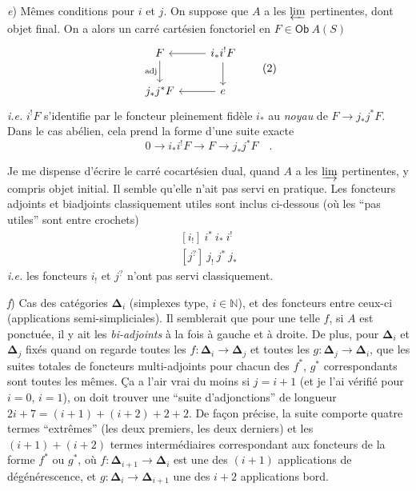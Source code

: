 \documentclass[11pt]{article}
\newcommand{\printedpage}[1]{\marginpar{\footnotesize p.~#1}}
\newcommand{\msp}[1]{\marginpar{\footnotesize [#1]}}
\newcommand{\Ob}{\mathsf{Ob}}
\newcommand{\bDelta}{\boldsymbol{\Delta}}
\begin{document}
\textit{e}) Mêmes conditions pour $i$ et $j$. On suppose que $A$ a les $\varprojlim$ pertinentes, dont objet final. On a alors un carré cartésien fonctoriel en $F\in \Ob\ A(S)$ 
\[
\begin{tikzcd}
F \arrow[d, "\text{adj}"'] & i_{*}i^{!}F \arrow[l] \arrow[d] \\
j_{*}j^{*}F & e \arrow[l]
\end{tikzcd}
\tag*{(2)}
\]
\textit{i.e.} $i^{!}F$ s'identifie par le foncteur pleinement fidèle $i_{*}$ au \textit{noyau} de $F\to j_{*}j^{*}F$. Dans le cas abélien, cela prend la forme d'une suite exacte
\[
0 \longrightarrow i_{*}i^{!}F \longrightarrow F \longrightarrow j_{*}j^{*}F \quad .
\]

\clearpage

\printedpage{3}

\msp{page 3}

Je me dispense d'écrire le carré cocartésien dual, quand $A$ a les $\varinjlim$ pertinentes, y compris objet initial. Il semble qu'elle n'ait pas servi en pratique. Les foncteurs adjoints et biadjoints classiquement utiles sont inclus ci-dessous (où les “pas utiles” sont entre crochets)
\[
\begin{aligned}
[i_{!}]\ i^{*}\ i_{*}\ i^{!} \\
[j^{?}]\ j_{!}\ j^{*}\ j_{*}
\end{aligned}
\]
\textit{i.e.} les foncteurs $i_{!}$ et $j^{?}$ n'ont pas servi classiquement.

\textit{f}) Cas des catégories $\bDelta_{i}$ (simplexes type, $i\in\mathbb{N}$), et des foncteurs entre ceux-ci (applications semi-simpliciales). Il semblerait que pour une telle $f$, si $A$ est ponctuée, il y ait les \textit{bi-adjoints} à la fois à gauche et à droite. De plus, pour $\bDelta_{i}$ et $\bDelta_{j}$ fixés quand on regarde toutes les $f:\bDelta_{i}\to\bDelta_{j}$ et toutes les $g:\bDelta_{j}\to\bDelta_{i}$, que les suites totales de foncteurs multi-adjoints pour chacun des $f^{*}$, $g^{*}$ correspondants sont toutes les mêmes. Ça a l'air vrai du moins si $j=i+1$ (et je l'ai vérifié pour $i=0$, $i=1$), on doit trouver une “suite d'adjonctions” de longueur $2i+7=(i+1)+(i+2)+2+2$. De façon précise, la suite comporte quatre termes “extrêmes” (les deux premiers, les deux derniers) et les $(i+1)+(i+2)$ termes intermédiaires correspondant aux foncteurs de la forme $f^{*}$ ou $g^{*}$, où $f:\bDelta_{i+1}\to\bDelta_{i}$ est une des $(i+1)$ applications de dégénérescence, et $g:\bDelta_{i}\to\bDelta_{i+1}$ une des $i+2$ applications bord.
\end{document}
